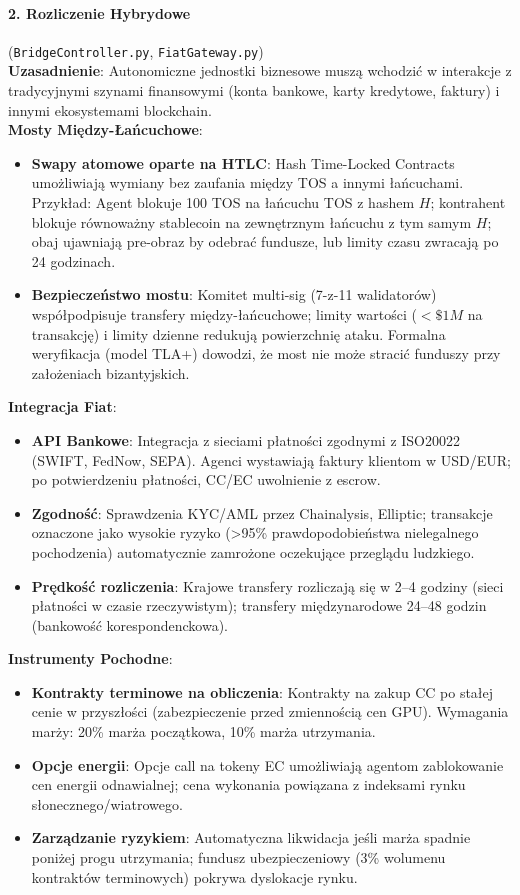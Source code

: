 \documentclass[11pt]{article}
\begin{document}
\paragraph{2. Rozliczenie Hybrydowe} (\texttt{BridgeController.py}, \texttt{FiatGateway.py})\\
\textbf{Uzasadnienie}: Autonomiczne jednostki biznesowe muszą wchodzić w interakcje z tradycyjnymi szynami finansowymi (konta bankowe, karty kredytowe, faktury) i innymi ekosystemami blockchain.\\
\textbf{Mosty Między-Łańcuchowe}:
\begin{itemize}[noitemsep]
  \item \textbf{Swapy atomowe oparte na HTLC}: Hash Time-Locked Contracts umożliwiają wymiany bez zaufania między TOS a innymi łańcuchami. Przykład: Agent blokuje 100 TOS na łańcuchu TOS z hashem $H$; kontrahent blokuje równoważny stablecoin na zewnętrznym łańcuchu z tym samym $H$; obaj ujawniają pre-obraz by odebrać fundusze, lub limity czasu zwracają po 24 godzinach.
  \item \textbf{Bezpieczeństwo mostu}: Komitet multi-sig (7-z-11 walidatorów) współpodpisuje transfery między-łańcuchowe; limity wartości ($<\$1M$ na transakcję) i limity dzienne redukują powierzchnię ataku. Formalna weryfikacja (model TLA+) dowodzi, że most nie może stracić funduszy przy założeniach bizantyjskich.
\end{itemize}
\textbf{Integracja Fiat}:
\begin{itemize}[noitemsep]
  \item \textbf{API Bankowe}: Integracja z sieciami płatności zgodnymi z ISO20022 (SWIFT, FedNow, SEPA). Agenci wystawiają faktury klientom w USD/EUR; po potwierdzeniu płatności, CC/EC uwolnienie z escrow.
  \item \textbf{Zgodność}: Sprawdzenia KYC/AML przez Chainalysis, Elliptic; transakcje oznaczone jako wysokie ryzyko (>95\% prawdopodobieństwa nielegalnego pochodzenia) automatycznie zamrożone oczekujące przeglądu ludzkiego.
  \item \textbf{Prędkość rozliczenia}: Krajowe transfery rozliczają się w 2--4 godziny (sieci płatności w czasie rzeczywistym); transfery międzynarodowe 24--48 godzin (bankowość korespondenckowa).
\end{itemize}
\textbf{Instrumenty Pochodne}:
\begin{itemize}[noitemsep]
  \item \textbf{Kontrakty terminowe na obliczenia}: Kontrakty na zakup CC po stałej cenie w przyszłości (zabezpieczenie przed zmiennością cen GPU). Wymagania marży: 20\% marża początkowa, 10\% marża utrzymania.
  \item \textbf{Opcje energii}: Opcje call na tokeny EC umożliwiają agentom zablokowanie cen energii odnawialnej; cena wykonania powiązana z indeksami rynku słonecznego/wiatrowego.
  \item \textbf{Zarządzanie ryzykiem}: Automatyczna likwidacja jeśli marża spadnie poniżej progu utrzymania; fundusz ubezpieczeniowy (3\% wolumenu kontraktów terminowych) pokrywa dyslokacje rynku.
\end{itemize}
\end{document}
